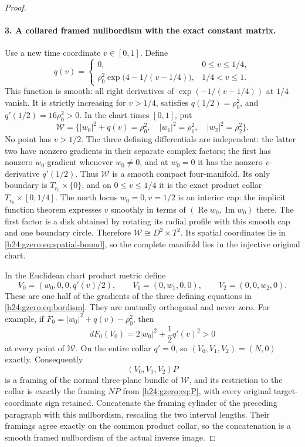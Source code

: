 \begin{proof}
\paragraph{3. A collared framed nullbordism with the exact constant matrix.}
Use a new time coordinate \(v\in[0,1]\). Define
\begin{equation}
 q(v)=
 \begin{cases}
 0,&0\leq v\leq1/4,\\
 \rho_0^2\exp\bigl(4-1/(v-1/4)\bigr),&1/4<v\leq1.
 \end{cases}
 \label{h24:gzero:eq:q}
\end{equation}
This function is smooth: all right derivatives of
\(\exp(-1/(v-1/4))\) at \(1/4\) vanish. It is strictly increasing
for \(v>1/4\), satisfies \(q(1/2)=\rho_0^2\), and
\(q'(1/2)=16\rho_0^2>0\).
In the chart times \([0,1]\), put
\begin{equation}
 \mathcal W=
 \{|w_0|^2+q(v)=\rho_0^2,\quad
       |w_1|^2=\rho_1^2,\quad|w_2|^2=\rho_2^2\}.
 \label{h24:gzero:eq:bordism}
\end{equation}
No point has \(v>1/2\). The three defining differentials are independent:
the latter two have nonzero gradients in their separate complex factors;
the first has nonzero \(w_0\)-gradient whenever \(w_0\ne0\), and at
\(w_0=0\) it has the nonzero \(v\)-derivative \(q'(1/2)\).
Thus \(\mathcal W\) is a smooth compact four-manifold. Its only
boundary is \(T_{r_0}\times\{0\}\), and on \(0\leq v\leq1/4\)
it is the exact product collar \(T_{r_0}\times[0,1/4]\).
The north locus \(w_0=0,v=1/2\) is an interior cap: the implicit
function theorem expresses \(v\) smoothly in terms of
\((\operatorname{Re}w_0,\operatorname{Im}w_0)\) there. The first
factor is a disk obtained by rotating its radial profile with this smooth
cap and one boundary circle. Therefore
\(\mathcal W\cong D^2\times T^2\).
Its spatial coordinates lie in \eqref{h24:gzero:eq:spatial-bound}, so the complete
manifold lies in the injective original chart.

In the Euclidean chart product metric define
\[
 V_0=(w_0,0,0,q'(v)/2),\qquad
 V_1=(0,w_1,0,0),\qquad V_2=(0,0,w_2,0).
\]
These are one half of the gradients of the three defining equations
in \eqref{h24:gzero:eq:bordism}. They are mutually orthogonal and never zero.
For example, if \(F_0=|w_0|^2+q(v)-\rho_0^2\), then
\[
 dF_0(V_0)=2|w_0|^2+\frac12q'(v)^2>0
\]
at every point of \(\mathcal W\). On the entire collar \(q'=0\), so
\((V_0,V_1,V_2)=(N,0)\) exactly. Consequently
\begin{equation}
 (V_0,V_1,V_2)P
 \label{h24:gzero:eq:extended-frame}
\end{equation}
is a framing of the normal three-plane bundle of \(\mathcal W\),
and its restriction to the collar is exactly the framing \(NP\) from
\eqref{h24:gzero:eq:P}, with every original target-coordinate sign retained.
Concatenate the framing cylinder of the preceding paragraph with this
nullbordism, rescaling the two interval lengths. Their framings agree
exactly on the common product collar, so the concatenation is a smooth
framed nullbordism of the actual inverse image.


\end{proof}
